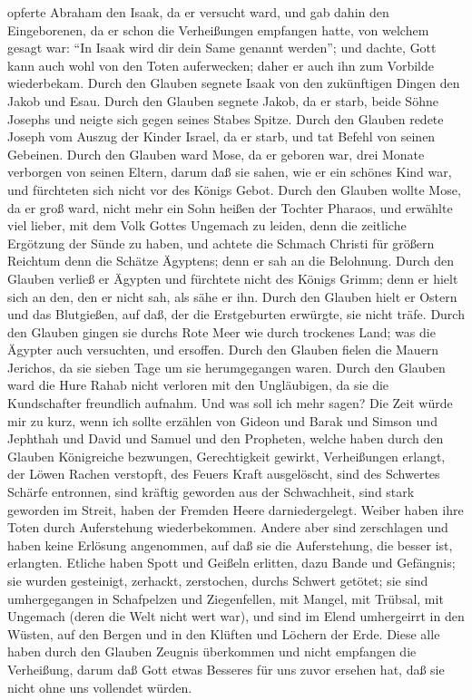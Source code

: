 opferte Abraham den Isaak, da er versucht ward, und gab dahin den
Eingeborenen, da er schon die Verheißungen empfangen hatte,
 von welchem gesagt war: ``In Isaak wird dir dein Same
genannt werden'';  und dachte, Gott kann auch wohl von den
Toten auferwecken; daher er auch ihn zum Vorbilde wiederbekam.
 Durch den Glauben segnete Isaak von den zukünftigen Dingen
den Jakob und Esau.  Durch den Glauben segnete Jakob, da er
starb, beide Söhne Josephs und neigte sich gegen seines Stabes Spitze.
 Durch den Glauben redete Joseph vom Auszug der Kinder
Israel, da er starb, und tat Befehl von seinen Gebeinen. 
Durch den Glauben ward Mose, da er geboren war, drei Monate verborgen
von seinen Eltern, darum daß sie sahen, wie er ein schönes Kind war, und
fürchteten sich nicht vor des Königs Gebot.  Durch den
Glauben wollte Mose, da er groß ward, nicht mehr ein Sohn heißen der
Tochter Pharaos,  und erwählte viel lieber, mit dem Volk
Gottes Ungemach zu leiden, denn die zeitliche Ergötzung der Sünde zu
haben,  und achtete die Schmach Christi für größern
Reichtum denn die Schätze Ägyptens; denn er sah an die Belohnung.
 Durch den Glauben verließ er Ägypten und fürchtete nicht
des Königs Grimm; denn er hielt sich an den, den er nicht sah, als sähe
er ihn.  Durch den Glauben hielt er Ostern und das
Blutgießen, auf daß, der die Erstgeburten erwürgte, sie nicht träfe.
 Durch den Glauben gingen sie durchs Rote Meer wie durch
trockenes Land; was die Ägypter auch versuchten, und ersoffen.
 Durch den Glauben fielen die Mauern Jerichos, da sie
sieben Tage um sie herumgegangen waren.  Durch den Glauben
ward die Hure Rahab nicht verloren mit den Ungläubigen, da sie die
Kundschafter freundlich aufnahm.  Und was soll ich mehr
sagen? Die Zeit würde mir zu kurz, wenn ich sollte erzählen von Gideon
und Barak und Simson und Jephthah und David und Samuel und den
Propheten,  welche haben durch den Glauben Königreiche
bezwungen, Gerechtigkeit gewirkt, Verheißungen erlangt, der Löwen Rachen
verstopft,  des Feuers Kraft ausgelöscht, sind des
Schwertes Schärfe entronnen, sind kräftig geworden aus der Schwachheit,
sind stark geworden im Streit, haben der Fremden Heere darniedergelegt.
 Weiber haben ihre Toten durch Auferstehung wiederbekommen.
Andere aber sind zerschlagen und haben keine Erlösung angenommen, auf
daß sie die Auferstehung, die besser ist, erlangten. 
Etliche haben Spott und Geißeln erlitten, dazu Bande und Gefängnis;
 sie wurden gesteinigt, zerhackt, zerstochen, durchs
Schwert getötet; sie sind umhergegangen in Schafpelzen und Ziegenfellen,
mit Mangel, mit Trübsal, mit Ungemach  (deren die Welt
nicht wert war), und sind im Elend umhergeirrt in den Wüsten, auf den
Bergen und in den Klüften und Löchern der Erde.  Diese alle
haben durch den Glauben Zeugnis überkommen und nicht empfangen die
Verheißung,  darum daß Gott etwas Besseres für uns zuvor
ersehen hat, daß sie nicht ohne uns vollendet würden.

